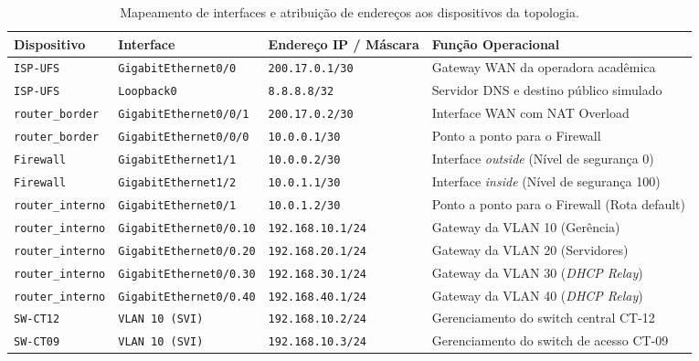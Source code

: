 \begin{table}[htbp]
\centering
\small
\caption{Mapeamento de interfaces e atribuição de endereços aos dispositivos da topologia.}
\label{tab:enderecamento_dispositivos}
\begin{tabularx}{\textwidth}{|l|l|l|Y|}
\hline
{}
\textbf{Dispositivo} & \textbf{Interface} & \textbf{Endereço IP / Máscara} & \textbf{Função Operacional} \\ \hline
\texttt{ISP-UFS} & \texttt{GigabitEthernet0/0} & \texttt{200.17.0.1/30} & Gateway WAN da operadora acadêmica \\ \hline
\texttt{ISP-UFS} & \texttt{Loopback0} & \texttt{8.8.8.8/32} & Servidor DNS e destino público simulado \\ \hline
\texttt{router\_border} & \texttt{GigabitEthernet0/0/1} & \texttt{200.17.0.2/30} & Interface WAN com NAT Overload \\ \hline
\texttt{router\_border} & \texttt{GigabitEthernet0/0/0} & \texttt{10.0.0.1/30} & Ponto a ponto para o Firewall \\ \hline
\texttt{Firewall} & \texttt{GigabitEthernet1/1} & \texttt{10.0.0.2/30} & Interface \textit{outside} (Nível de segurança 0) \\ \hline
\texttt{Firewall} & \texttt{GigabitEthernet1/2} & \texttt{10.0.1.1/30} & Interface \textit{inside} (Nível de segurança 100) \\ \hline
\texttt{router\_interno} & \texttt{GigabitEthernet0/1} & \texttt{10.0.1.2/30} & Ponto a ponto para o Firewall (Rota default) \\ \hline
\texttt{router\_interno} & \texttt{GigabitEthernet0/0.10} & \texttt{192.168.10.1/24} & Gateway da VLAN 10 (Gerência) \\ \hline
\texttt{router\_interno} & \texttt{GigabitEthernet0/0.20} & \texttt{192.168.20.1/24} & Gateway da VLAN 20 (Servidores) \\ \hline
\texttt{router\_interno} & \texttt{GigabitEthernet0/0.30} & \texttt{192.168.30.1/24} & Gateway da VLAN 30 (\textit{DHCP Relay}) \\ \hline
\texttt{router\_interno} & \texttt{GigabitEthernet0/0.40} & \texttt{192.168.40.1/24} & Gateway da VLAN 40 (\textit{DHCP Relay}) \\ \hline
\texttt{SW-CT12} & \texttt{VLAN 10 (SVI)} & \texttt{192.168.10.2/24} & Gerenciamento do switch central CT-12 \\ \hline
\texttt{SW-CT09} & \texttt{VLAN 10 (SVI)} & \texttt{192.168.10.3/24} & Gerenciamento do switch de acesso CT-09 \\ \hline

\end{tabularx}
\end{table}

